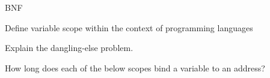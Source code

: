\documentclass{exam} %
\begin{document}
\begin{questions}
  \question BNF
  \pagebreak

  \question Define variable scope within the context of programming languages

  \question Explain the dangling-else problem.

  \question How long does each of the below scopes bind a variable to an address?


\end{questions}
\end{document}
